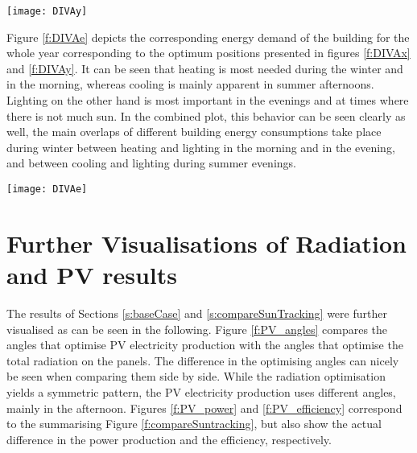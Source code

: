 	\begin{figure*}
		\begin{center}
		\texttt{[image: DIVAy]}
		\caption{Carpet plots detailing the optimal azimuth angles to minimise the (a) heating demand, (b) cooling demand, (c) lighting demand, and (d) total building energy demand. Cooling is minimized by blocking the sun, whereas lighting and heating are minimized by opening the facade to let the insolation in.}
		\label{f:DIVAy}
		\end{center}
	\end{figure*}

	Figure \ref{f:DIVAe} depicts the corresponding energy demand of the building for the whole year corresponding to the optimum positions presented in figures \ref{f:DIVAx} and \ref{f:DIVAy}. It can be seen that heating is most needed during the winter and in the morning, whereas cooling is mainly apparent in summer afternoons. Lighting on the other hand is most important in the evenings and at times where there is not much sun. In the combined plot, this behavior can be seen clearly as well, the main overlaps of different building energy consumptions take place during winter between heating and lighting in the morning and in the evening, and between cooling and lighting during summer evenings. 

	\begin{figure*}
		\begin{center}
		\texttt{[image: DIVAe]}
		\caption{Carpet plots detailing the energy consumption during every hour of the year for the (a) heating demand, (b) cooling demand, (c) lighting demand, and (d) total building energy demand.}
		\label{f:DIVAe}
		\end{center}
	\end{figure*}
	


\section{Further Visualisations of Radiation and PV results}
\label{a:PV}

	The results of Sections \ref{s:baseCase} and \ref{s:compareSunTracking} were further visualised as can be seen in the following. Figure \ref{f:PV_angles} compares the angles that optimise PV electricity production with the angles that optimise the total radiation on the panels. The difference in the optimising angles can nicely be seen when comparing them side by side. While the radiation optimisation yields a symmetric pattern, the PV electricity production uses different angles, mainly in the afternoon. Figures \ref{f:PV_power} and \ref{f:PV_efficiency} correspond to the summarising Figure \ref{f:compareSuntracking}, but also show the actual difference in the power production and the efficiency, respectively. 

